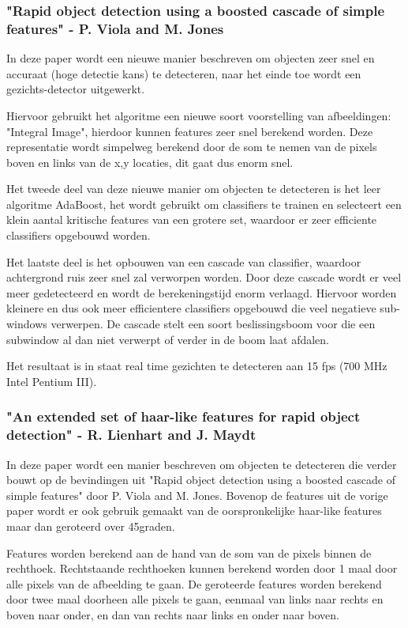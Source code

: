 \documentclass[]{article}
\begin{document}
\subsubsection*{"Rapid object detection using a boosted cascade of simple features" - P. Viola and M. Jones}

In deze paper wordt een nieuwe manier beschreven om objecten zeer snel en accuraat (hoge detectie kans) te detecteren, naar het einde toe wordt een gezichts-detector uitgewerkt.

Hiervoor gebruikt het algoritme een nieuwe soort voorstelling van afbeeldingen: "Integral Image", hierdoor kunnen features zeer snel berekend worden. Deze representatie wordt simpelweg berekend door de som te nemen van de pixels boven en links van de x,y locaties, dit gaat dus enorm snel.

Het tweede deel van deze nieuwe manier om objecten te detecteren is het leer algoritme AdaBoost, het wordt gebruikt om classifiers te trainen en selecteert een klein aantal kritische features van een grotere set, waardoor er zeer efficiente classifiers opgebouwd worden.

Het laatste deel is het opbouwen van een cascade van classifier, waardoor achtergrond ruis zeer snel zal verworpen worden. Door deze cascade wordt er veel meer gedetecteerd en wordt de berekeningstijd enorm verlaagd. Hiervoor worden kleinere en dus ook meer efficientere classifiers opgebouwd die veel negatieve sub-windows verwerpen. De cascade stelt een soort beslissingsboom voor die een subwindow al dan niet verwerpt of verder in de boom laat afdalen.

Het resultaat is in staat real time gezichten te detecteren aan 15 fps (700 MHz Intel Pentium III).


\subsubsection*{"An extended set of haar-like features for rapid object detection" - R. Lienhart and J. Maydt}

In deze paper wordt een manier beschreven om objecten te detecteren die verder bouwt op de bevindingen uit "Rapid object detection using a boosted cascade of simple features" door P. Viola and M. Jones. Bovenop de features uit de vorige paper wordt er ook gebruik gemaakt van de oorspronkelijke haar-like features maar dan geroteerd over 45graden.

Features worden berekend aan de hand van de som van de pixels binnen de rechthoek. Rechtstaande rechthoeken kunnen berekend worden door 1 maal door alle pixels van de afbeelding te gaan. De geroteerde features worden berekend door twee maal doorheen alle pixels te gaan, eenmaal van links naar rechts en boven naar onder, en dan van rechts naar links en onder naar boven.
\end{document}
